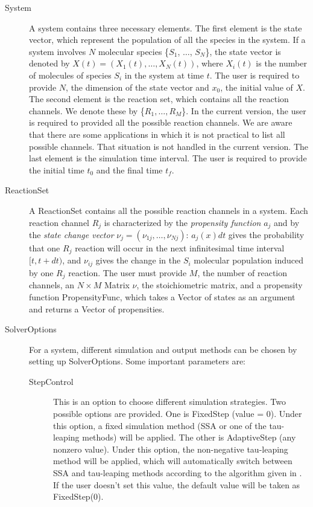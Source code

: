\documentclass[12pt]{article}
\begin{document}
\begin{description}
\item[System] A system contains three necessary elements.
The first element is the state vector, which represent the 
population of all the species in the system.
If a system involves $N$ molecular species \{$S_1$, $\ldots$, $S_N$\},
the state vector is denoted by $X(t) = (X_1(t), \ldots, X_N(t))$, where $X_i(t)$ is
the number of molecules of species $S_i$ in the system at time $t$. The user
is required to provide $N$, the dimension of the state vector
and $x_0$, the initial value of $X$.
The second element is the reaction set, which contains all the reaction channels.
We denote these by \{$R_1, \ldots, R_M$\}. In the current version, the user is
required to provided all the possible reaction
channels. We are aware that there are some applications in which it
is not practical to list all possible channels. That situation is not
handled in the current version.
The last element is the simulation time interval. The user is
required to provide the initial time $t_0$ and the final time $t_f$.

\item[ReactionSet] A ReactionSet contains all the possible reaction
channels in a system. Each reaction channel $R_j$ is characterized by
the {\it propensity function} $a_j$ and by the {\it state change vector} $\nu_j= (\nu_{1j}, \ldots,
\nu_{Nj})$: $a_j(x)dt$ gives the probability that one $R_j$ reaction
will occur in the next infinitesimal time interval $[t, t+dt)$, and $\nu_{ij}$ gives the
change in the $S_i$ molecular population induced by one $R_j$ reaction.
The user must provide $M$, the number of reaction channels,
an $N \times M$ Matrix $\nu$, the stoichiometric  matrix,
and a propensity function PropensityFunc, which takes a Vector of states
as an argument and returns a Vector of propensities.

\item[SolverOptions] For a system, different simulation and output methods
can be chosen by setting up SolverOptions. Some important parameters are:
 \begin{description}

    \item[StepControl] This is an option to choose different simulation 
	strategies. Two possible options are provided. 
    One is FixedStep (value = 0). Under this option, a fixed simulation 
	method (SSA or one of the tau-leaping methods) will be applied. 
    The other is AdaptiveStep (any nonzero value). Under this option, 
	the non-negative tau-leaping method \cite{adaptive} will be applied, which will 
	automatically switch between SSA and tau-leaping methods according
	to the algorithm given in \cite{adaptive}. If the user doesn't set 
	this value, the default value will be taken as FixedStep(0). 


\end{description}
\end{description}
\end{document}
